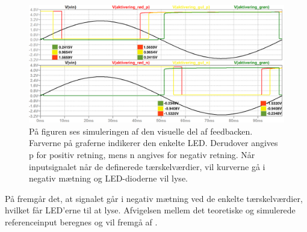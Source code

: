 \begin{figure}[H]
	\centering
	\includegraphics[scale=0.36]{figures/cProblemloesning/komparator_visuel_simulering_samlet1.PNG}
	\caption{På figuren ses simuleringen af den visuelle del af feedbacken. Farverne på graferne indikerer den enkelte LED. Derudover angives p for positiv retning, mens n angives for negativ retning. Når inputsignalet når de definerede tærskelværdier, vil kurverne gå i negativ mætning og LED-dioderne vil lyse.}
	\label{fig:komparator_visuel_simulering_samlet1}
\end{figure}

\noindent På  fremgår det, at signalet går i negativ mætning ved de enkelte tærskelværdier, hvilket får LED'erne til at lyse. Afvigelsen mellem det teoretiske og simulerede referenceinput beregnes og vil fremgå af .

